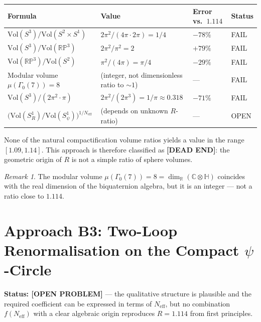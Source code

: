 \documentclass[11pt,a4paper]{article}
\theoremstyle{remark}
\newtheorem{remark}{Remark}
\begin{document}
\begin{center}
\begin{tabular}{llll}
  \toprule
  Formula & Value & Error vs.\ $1.114$ & Status \\
  \midrule
  $\mathrm{Vol}(S^3)/\mathrm{Vol}(S^2\times S^1)$
    & $2\pi^2 / (4\pi \cdot 2\pi) = 1/4$
    & $-78\%$ & FAIL \\
  $\mathrm{Vol}(S^3)/\mathrm{Vol}(\mathbb{RP}^3)$
    & $2\pi^2 / \pi^2 = 2$
    & $+79\%$ & FAIL \\
  $\mathrm{Vol}(\mathbb{RP}^3)/\mathrm{Vol}(S^2)$
    & $\pi^2 / (4\pi) = \pi/4$
    & $-29\%$ & FAIL \\
  Modular volume $\mu(\Gamma_0(7)) = 8$
    & (integer, not dimensionless ratio to $\sim 1$)
    & --- & FAIL \\
  $\mathrm{Vol}(S^3) / (2\pi^2 \cdot \pi)$
    & $2\pi^2 / (2\pi^3) = 1/\pi \approx 0.318$
    & $-71\%$ & FAIL \\
  $\bigl(\mathrm{Vol}(S^1_R) / \mathrm{Vol}(S^1_\psi)\bigr)^{1/N_{\mathrm{eff}}}$
    & (depends on unknown $R$-ratio) & --- & OPEN \\
  \bottomrule
\end{tabular}
\end{center}

None of the natural compactification volume ratios yields a value in the
range $[1.09, 1.14]$.  This approach is therefore classified as
\textbf{[DEAD END]}: the geometric origin of $R$ is not a simple ratio
of sphere volumes.

\begin{remark}
  The modular volume $\mu(\Gamma_0(7)) = 8 = \dim_\mathbb{R}(\mathbb{C}\otimes\mathbb{H})$
  coincides with the real dimension of the biquaternion algebra, but it is an
  integer — not a ratio close to $1.114$.
\end{remark}

\section{Approach B3: Two-Loop Renormalisation on the Compact $\psi$-Circle}
\label{sec:B3_twoloop}

\textbf{Status: [OPEN PROBLEM]} — the qualitative structure is plausible and
the required coefficient can be expressed in terms of $N_{\mathrm{eff}}$, but
no combination $f(N_{\mathrm{eff}})$ with a clear algebraic origin reproduces
$R = 1.114$ from first principles.
\end{document}
